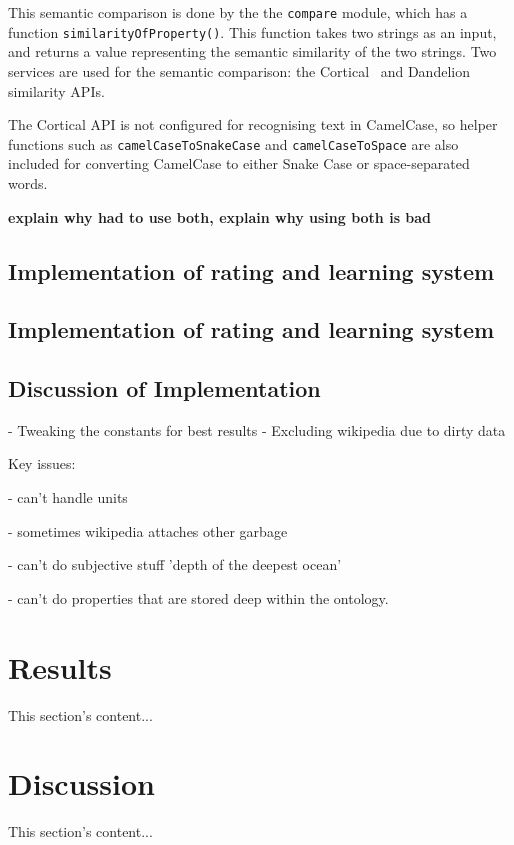 \documentclass[authoryearcitations]{UoYCSproject}
\begin{document}
This semantic comparison is done by the the \texttt{compare} module, which has a function \texttt{similarityOfProperty()}. This function takes two strings as an input, and returns a value representing the semantic similarity of the two strings. Two services are used for the semantic comparison: the Cortical~\cite{serviceCorticalSim} and Dandelion~\cite{serviceDandelionSim} similarity APIs.

The Cortical API is not configured for recognising text in CamelCase, so helper functions such as \texttt{camelCaseToSnakeCase} and \texttt{camelCaseToSpace} are also included for converting CamelCase to either Snake Case or space-separated words.

{\bf explain why had to use both, explain why using both is bad}

\section{Implementation of rating and learning system}

\section{Implementation of rating and learning system}

\section{Discussion of Implementation}
 - Tweaking the constants for best results
 - Excluding wikipedia due to dirty data
 
Key issues:

 - can't handle units
 
 - sometimes wikipedia attaches other garbage
 
 - can't do subjective stuff 'depth of the deepest ocean'
 
 - can't do properties that are stored deep within the ontology.

\newpage
\chapter{Results}
\label{sec:results}
This section's content...

\newpage
\chapter{Discussion}
\label{sec:discussion}
This section's content...
\end{document}
